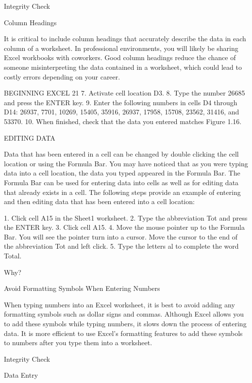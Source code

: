 

Integrity Check

Column Headings

It is critical to include column headings that accurately describe the data in each column of a worksheet. In
professional environments, you will likely be sharing Excel workbooks with coworkers. Good column headings
reduce the chance of someone misinterpreting the data contained in a worksheet, which could lead to costly errors
depending on your career.




BEGINNING EXCEL 21
7. Activate cell location D3.
8. Type the number 26685 and press the ENTER key.
9. Enter the following numbers in cells D4 through
D14: 26937, 7701, 10269, 15405, 35916, 26937, 17958, 15708, 23562, 31416, and 53370.
10. When finished, check that the data you entered matches Figure 1.16.

EDITING DATA

Data that has been entered in a cell can be changed by double clicking the cell location or using
the Formula Bar. You may have noticed that as you were typing data into a cell location, the data you
typed appeared in the Formula Bar. The Formula Bar can be used for entering data into cells as well
as for editing data that already exists in a cell. The following steps provide an example of entering and
then editing data that has been entered into a cell location:

1. Click cell A15 in the Sheet1 worksheet.
2. Type the abbreviation Tot and press the ENTER key.
3. Click cell A15.
4. Move the mouse pointer up to the Formula Bar. You will see the pointer turn into a cursor.
Move the cursor to the end of the abbreviation Tot and left click.
5. Type the letters al to complete the word Total.




Why?

Avoid Formatting Symbols When Entering Numbers

When typing numbers into an Excel worksheet, it is best to avoid adding any formatting symbols such as dollar signs
and commas. Although Excel allows you to add these symbols while typing numbers, it slows down the process of
entering data. It is more efficient to use Excel’s formatting features to add these symbols to numbers after you type
them into a worksheet.




Integrity Check

Data Entry


